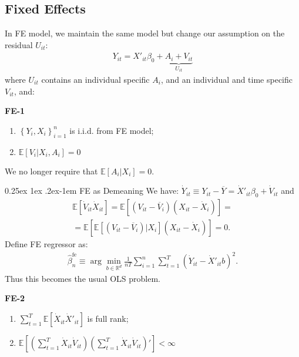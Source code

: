 \documentclass[9pt]{extarticle}
\makeatletter
\newcommand{\EE}{\mathbb{E}}
\renewcommand{\paragraph}{%
  \@startsection{paragraph}{4}%
  {\z@}{0.25ex \@plus 1ex \@minus .2ex}{-1em}%
  {\normalfont\normalsize\bfseries}%
}
\makeatother
\begin{document}
\begin{multicols*}{4}
\subsection*{Fixed Effects}
In FE model, we maintain the same model but change our assumption on the residual $U_{it}$:
\begin{align*}
    Y_{it}=X'_{it}\beta_{0}+\underset{U_{it}}{\underbrace{A_{i}+V_{it}}}
\end{align*}
where $U_{it}$ contains an individual specific $A_{i}$, and an individual and time specific $V_{it}$, and:

\textbf{FE-1}
\begin{enumerate}[label=(\roman*)]
    \item $\left\{ Y_{i},X_{i}\right\} _{i=1}^{n}$ is i.i.d. from FE model;
    \item $\EE\left[V_{i}|X_{i},A_{i}\right]=0$
\end{enumerate}
We no longer require that $\EE\left[A_{i}|X_{i}\right]=0$.

\paragraph{FE as Demeaning}
We have: $\dot{Y}_{it}\equiv Y_{it}-\overline{Y}=\dot{X}'_{it}\beta_{0}+\dot{V}_{it}$ and
\begin{gather*}
    \EE[\dot{V}_{it}\dot{X}_{it}] = \EE[(V_{it}-\overline{V}_{i})(X_{it}-\dot{X}_{i})] = \\
    = \EE[\EE[(V_{it}-\overline{V}_{i})|X_{i}](X_{it}-\dot{X}_{i})] = 0.
\end{gather*}
Define FE regressor as:
\begin{gather*}
    \hat{\beta}_{n}^{\mathrm{fe}}\equiv\arg\underset{b\in\mathbb{R}^{d}}{\min}\frac{1}{nT}\sum_{i=1}^{n}\sum_{t=1}^{T}\left(\dot{Y}_{it}-\dot{X}'_{it}b\right)^{2}.
\end{gather*}
Thus this becomes the usual OLS problem.

\textbf{FE-2}
\begin{enumerate}[label=(\roman*)]
    \item $\sum_{t=1}^{T}\EE\left[\dot{X}_{it}\dot{X}'_{it}\right]$ is full rank;
    \item $\displaystyle \EE\left[(\sum_{t=1}^{T}\dot{X}_{it}\dot{V}{}_{it})(\sum_{t=1}^{T}\dot{X}_{it}\dot{V}_{it})'\right]<\infty$
\end{enumerate}

 


\end{multicols*}
\end{document}
